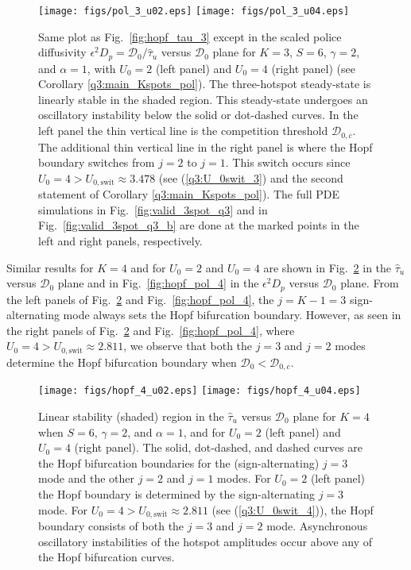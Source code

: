 \documentclass{article}%
\begin{document}
\begin{figure}[htbp]
\centering
\texttt{[image: figs/pol\_3\_u02.eps]}
\texttt{[image: figs/pol\_3\_u04.eps]}
\caption{\label{fig:hopf_pol_3} Same plot as Fig.~\ref{fig:hopf_tau_3}
  except in the scaled police diffusivity $\epsilon^{2}D_p={{\mathcal
      D}_0/\hat{\tau}_u}$ versus ${\mathcal D}_0$ plane for $K=3$,
  $S=6$, $\gamma=2$, and $\alpha=1$, with $U_0=2$ (left panel) and
  $U_{0}=4$ (right panel) (see Corollary
  \ref{q3:main_Kspots_pol}). The three-hotspot steady-state is
  linearly stable in the shaded region. This steady-state undergoes an
  oscillatory instability below the solid or dot-dashed curves. In the
  left panel the thin vertical line is the competition threshold
  ${\mathcal D}_{0,c}$. The additional thin vertical line in the right
  panel is where the Hopf boundary switches from $j=2$ to $j=1$. This
  switch occurs since $U_0=4>U_{0,\textrm{swit}}\approx 3.478$ (see
  (\ref{q3:U_0swit_3}) and the second statement of Corollary
  \ref{q3:main_Kspots_pol}). The full PDE simulations in
  Fig.~\ref{fig:valid_3spot_q3} and in Fig.~\ref{fig:valid_3spot_q3_b}
  are done at the marked points in the left and right panels,
  respectively.}
\end{figure}


Similar results for $K=4$ and for $U_0=2$ and $U_0=4$ are shown in
Fig.~\ref{fig:hopf_tau_4} in the $\hat{\tau}_u$ versus ${\mathcal D}_0$
plane and in Fig.~\ref{fig:hopf_pol_4} in the $\epsilon^2 D_p$ versus
${\mathcal D}_0$ plane. From the left panels of
Fig.~\ref{fig:hopf_tau_4} and Fig.~\ref{fig:hopf_pol_4}, the $j=K-1=3$
sign-alternating mode always sets the Hopf bifurcation boundary. However,
as seen in the right panels of Fig.~\ref{fig:hopf_tau_4} and 
Fig.~\ref{fig:hopf_pol_4}, where $U_0=4>U_{0,\textrm{swit}}\approx 2.811$, we 
observe that both the $j=3$ and $j=2$ modes determine the Hopf bifurcation
boundary when ${\mathcal D}_0<{\mathcal D}_{0,c}$.


\begin{figure}[htbp]
\centering
\texttt{[image: figs/hopf\_4\_u02.eps]}
\texttt{[image: figs/hopf\_4\_u04.eps]}
\caption{\label{fig:hopf_tau_4} Linear stability (shaded) region in
  the $\hat{\tau}_u$ versus ${\mathcal D}_0$ plane for $K=4$ when
  $S=6$, $\gamma=2$, and $\alpha=1$, and for $U_0=2$ (left panel) and
  $U_{0}=4$ (right panel). The solid, dot-dashed, and dashed curves
  are the Hopf bifurcation boundaries for the (sign-alternating) $j=3$
  mode and the other $j=2$ and $j=1$ modes. For $U_0=2$ (left panel)
  the Hopf boundary is determined by the sign-alternating $j=3$ mode.
  For $U_0=4>U_{0,\textrm{swit}}\approx 2.811$ (see
  (\ref{q3:U_0swit_4})), the Hopf boundary consists of both the $j=3$
  and $j=2$ mode. Asynchronous oscillatory instabilities of the
  hotspot amplitudes occur above any of the Hopf bifurcation curves.}
\end{figure}
\end{document}
